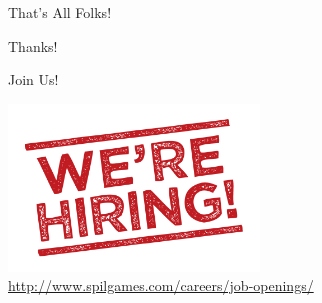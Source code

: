 \documentclass[aspectratio=43]{beamer}
\begin{document}
\begin{frame}{That's All Folks!}
    \begin{center}
        \huge{Thanks!}
    \end{center}
\end{frame}

\begin{frame}{Join Us!}
    \begin{center}
        \includegraphics[width=0.5\textwidth]{images/hiring.png}\\
        \href{http://www.spilgames.com/careers/job-openings/}{\large{http://www.spilgames.com/careers/job-openings/}}
    \end{center}
\end{frame}
\end{document}
